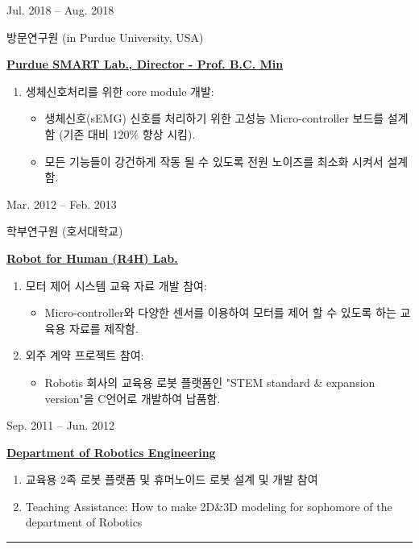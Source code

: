 \documentclass[a4paper,10pt]{article}
\newlength{\cvcolumngapwidth}
\newlength{\cvleftcolumnwidth}
\newlength{\cvrightcolumnwidth}
\newcommand{\cvsectionstyle}[1]{{\normalsize\cvsectionfont\textcolor{cvsectioncolor}{#1}}}
\newcommand{\cvtitlestyle}[1]{{\large\cvtitlefont\textcolor{cvtitlecolor}{#1}}}
\newcommand{\cvdurationstyle}[1]{{\small\cvdurationfont\textcolor{cvdurationcolor}{#1}}}
\newlength{\cvafteritemskipamount}
\newlength{\cvaftersectionskipamount}
\newlength{\cvaftertitleskipamount}
\newlength{\cvparskip}
\newcommand{\cvsection}[1]{
    \begin{minipage}[t]{\cvleftcolumnwidth}
        \raggedleft\cvsectionstyle{#1}
    \end{minipage}%
    \hspace{\cvcolumngapwidth}%
    \begin{minipage}[t]{\cvrightcolumnwidth}
        \textcolor{cvrulecolor}{\rule{\cvrightcolumnwidth}{0.3mm}}
    \end{minipage}

    \vspace{\cvaftersectionskipamount}
}
\newcommand{\cvitem}[2]{
    \begin{minipage}[t]{\cvleftcolumnwidth}
        \raggedleft #1
    \end{minipage}%
    \hspace{\cvcolumngapwidth}%
    \begin{minipage}[t]{\cvrightcolumnwidth}
        \setlength{\parskip}{\cvparskip} #2
    \end{minipage}

    \vspace{\cvafteritemskipamount}
}
\newcommand{\cvtitle}[1]{
    \cvtitlestyle{#1}

    \vspace{\cvaftertitleskipamount}
    \vspace{-\cvparskip}
}
\begin{document}
\cvitem{
    \cvdurationstyle{Jul. 2018 -- Aug. 2018}
}{
    \cvtitle{방문연구원 (in Purdue University, USA)} 
    \item \underline{\textbf{Purdue SMART Lab., Director - Prof. B.C. Min}}
    \begin{enumerate}[leftmargin=*]
        \item 생체신호처리를 위한 core module 개발:
        \begin{itemize}
            \item 생체신호(sEMG) 신호를 처리하기 위한 고성능 Micro-controller 보드를 설계함 (기존 대비 120\% 향상 시킴).
            \item 모든 기능들이 강건하게 작동 될 수 있도록 전원 노이즈를 최소화 시켜서 설계함.
        \end{itemize}
    \end{enumerate}
}


\cvitem{
    \cvdurationstyle{Mar. 2012 -- Feb. 2013}
}{
    \cvtitle{학부연구원 (호서대학교)}
    \underline{\textbf{Robot for Human (R4H) Lab.}}
    \begin{enumerate}[leftmargin=*]
        \item 모터 제어 시스템 교육 자료 개발 참여:
        \begin{itemize}
            \item Micro-controller와 다양한 센서를 이용하여 모터를 제어 할 수 있도록 하는 교육용 자료를 제작함.
        \end{itemize}
        \item 외주 계약 프로젝트 참여: 
        \begin{itemize}
            \item Robotis 회사의 교육용 로봇 플랫폼인 "STEM standard \& expansion version"을 C언어로 개발하여 납품함.
        \end{itemize}
    \end{enumerate}
}

\cvitem{
    \cvdurationstyle{Sep. 2011 -- Jun. 2012}    
}{
    \underline {\textbf{Department of Robotics Engineering}}
    \begin{enumerate}[leftmargin=*]
        \item 교육용 2족 로봇 플랫폼 및 휴머노이드 로봇 설계 및 개발 참여
        \item Teaching Assistance: How to make 2D\&3D modeling for sophomore of the department of Robotics
    \end{enumerate}
    }

\cvsection{Awards and Honors}
\end{document}
